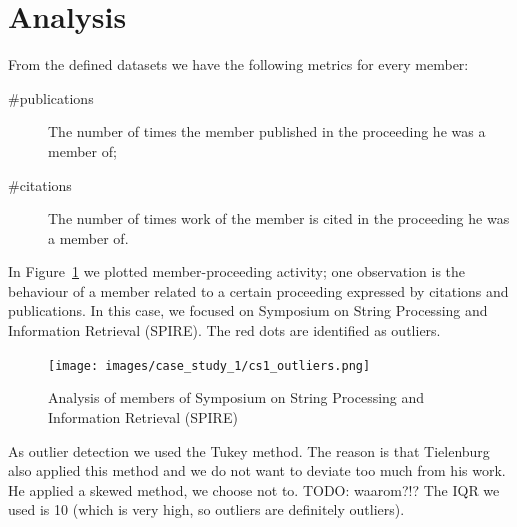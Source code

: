 \documentclass{ou-report}
\newcommand{\todo}[1]{{\color{red} TODO: #1}}
\newcommand{\outline}[1]{{\color{blue} #1}}
\begin{document}



\section{Analysis}

From the defined datasets we have the following metrics for every member:
\begin{description}
    \item[\#publications] The number of times the member published in the 
    proceeding he was a member of;
    \item[\#citations] The number of times work of the member is cited in the 
    proceeding he was a member of.
\end{description}
In Figure~\ref{fig:analysis_members} we plotted member-proceeding activity;
one observation is the behaviour of a member related to a certain proceeding
expressed by citations and publications. In this case, we focused on Symposium 
on String Processing and Information Retrieval (SPIRE).
The red dots are identified as outliers.

\begin{figure}[H]
    \centering
    \texttt{[image: images/case\_study\_1/cs1\_outliers.png]}
    \caption{Analysis of members of Symposium on String Processing and 
    Information Retrieval (SPIRE)}
    \label{fig:analysis_members}
\end{figure}

As outlier detection we used the Tukey method. The reason is that Tielenburg 
also applied this method and we do not want to deviate too much from his work.
He applied a skewed method, we choose not to. \todo{waarom?!?} The IQR we used is 10 (which is 
very high, so outliers are definitely outliers).
\end{document}
